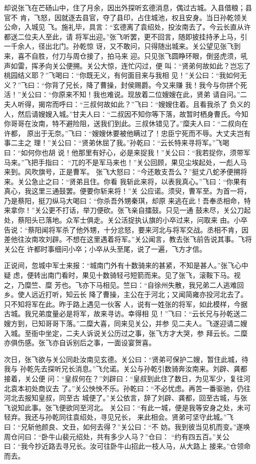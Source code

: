 却说张飞在芒砀山中，住了月余，因出外探听玄德消息，偶过古城。入县借粮；县官不
肯，飞怒，因就逐去县官，夺了县印，占住城池，权且安身。当日孙乾领关公命，入城见
飞。施礼毕，具言：“玄德离了袁绍处，投汝南去了。今云长直从许都送二位夫人至此，请
将军出迎。”张飞听罢，更不回言，随即披挂持矛上马，引一千余人，径出北门。孙乾惊
讶，又不敢问，只得随出城来。关公望见张飞到来，喜不自胜，付刀与周仓接了，拍马来
迎。只见张飞圆睁环眼，倒竖虎须，吼声如雷，挥矛向关公便搠。关公大惊，连忙闪过，便
叫：“贤弟何故如此？岂忘了桃园结义耶？”飞喝曰：“你既无义，有何面目来与我相
见！”关公曰：“我如何无义？”飞曰：“你背了兄长，降了曹操，封侯赐爵。今又来赚
我！我今与你拼个死活！”关公曰：“你原来不知！我也难说。现放着二位嫂嫂在此，贤弟
请自问。”二夫人听得，揭帘而呼曰：“三叔何故如此？”飞曰：“嫂嫂住着。且看我杀了
负义的人，然后请嫂嫂入城。”甘夫人曰：“二叔因不知你等下落，故暂时栖身曹氏。今知
你哥哥在汝南，特不避险阻，送我们到此。三叔休错见了。”糜夫人曰：“二叔向在许都，
原出于无奈。”飞曰：“嫂嫂休要被他瞒过了！忠臣宁死而不辱。大丈夫岂有事二主之
理！”关公曰：“贤弟休屈了我。”孙乾曰：“云长特来寻将军。”飞喝曰：“如何你也胡
说！他那里有好心，必是来捉我！”关公曰：“我若捉你，须带军马来。”飞把手指曰：
“兀的不是军马来也！”关公回顾，果见尘埃起处，一彪人马来到。风吹旗号，正是曹军。
张飞大怒曰：“今还敢支吾么？”挺丈八蛇矛便搠将来。关公急止之曰：“贤弟且住。你看
我斩此来将，以表我真心。”飞曰：“你果有真心，我这里三通鼓罢。便要你斩来将！”关
公应诺。须臾，曹军至。为首一将，乃是蔡阳，挺刀纵马大喝曰：“你杀吾外甥秦琪，却原
来逃在此！吾奉丞相命，特来拿你！”关公更不打话，举刀便砍。张飞亲自擂鼓。只见一通
鼓未尽，关公刀起处，蔡阳头已落地。众军士俱走。关公活捉执认旗的小卒过来，问取来
由。小卒告说：“蔡阳闻将军杀了他外甥，十分忿怒，要来河北与将军交战。丞相不肯，因
差他往汝南攻刘辟。不想在这里遇着将军。”关公闻言，教去张飞前告说其事。飞将关公在
许都时事细问小卒；小卒从头至尾，说了一遍，飞方才信。

正说间，忽城中军士来报：“城南门外有十数骑来的甚紧，不知是甚人。”张飞心中疑
虑，便转出南门看时，果见十数骑轻弓短箭而来。见了张飞，滚鞍下马。视之，乃糜竺、糜
芳也。飞亦下马相见。竺曰：“自徐州失散，我兄弟二人逃难回乡。使人远近打听，知云长
降了曹操，主公在于河北；又闻简雍亦投河北去了。只不知将军在此。昨于路上遇见一伙客
人，说有一姓张的将军，如此模样，今据古城。我兄弟度量必是将军，故来寻访。幸得相
见！”飞曰：“云长兄与孙乾送二嫂方到，已知哥哥下落。”二糜大喜，同来见关公，并参
见二夫人。飞遂迎请二嫂入城。至衙中坐定，二夫人诉说关公历过之事，张飞方才大哭，参
拜云长。二糜亦俱伤感。张飞亦自诉别后之事，一面设宴贺喜。

次日，张飞欲与关公同赴汝南见玄德。关公曰：“贤弟可保护二嫂，暂住此城，待我与
孙乾先去探听兄长消息。”飞允诺。关公与孙乾引数骑奔汝南来。刘辟、龚都接着，关公便
问：“皇叔何在？”刘辟曰：“皇叔到此住了数日，为见军少，复往河北袁本初处商议去
了。”关公怏怏不乐。孙乾曰：“不必忧虑。再苦一番驱驰，仍往河北去报知皇叔，同至古
城便了。”关公依言，辞了刘辟、龚都，回至古城，与张飞说知此事。张飞便欲同至河北。
关公曰：“有此一城，便是我等安身之处，未可轻弃。我还与孙乾同往袁绍处，寻见兄长，
来此相会。贤弟可坚守此城。”飞曰：“兄斩他颜良、文丑，如何去得？”关公曰：“不
妨。我到彼当见机而变。”遂唤周仓问曰：“卧牛山裴元绍处，共有多少人马？”仓曰：
“约有四五百。”关公曰：“我今抄近路去寻兄长。汝可往卧牛山招此一枝人马，从大路上
接来。”仓领命而去。

